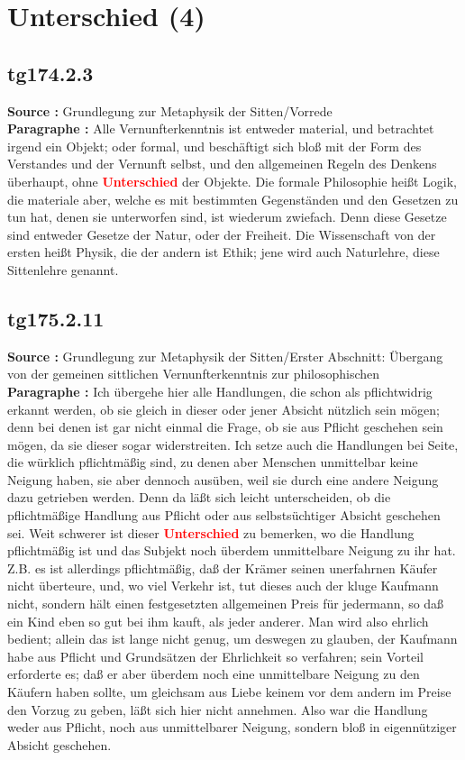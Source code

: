 \documentclass[a4paper,12pt,twoside]{book}
\newcommand{\match}[1]{\textcolor{red}{\textbf{#1}}}
\newcommand{\unnumberedsection}[1]{
	\section*{#1}
	\addcontentsline{toc}{section}{#1}
	\markright{#1}
}
\begin{document}
	\unnumberedsection{Unterschied (4)} 
	\subsection*{tg174.2.3} 
	\textbf{Source : }Grundlegung zur Metaphysik der Sitten/Vorrede\\  
	
	\noindent\textbf{Paragraphe : }Alle Vernunfterkenntnis ist entweder material, und betrachtet irgend ein Objekt; oder formal, und beschäftigt sich bloß mit der Form des Verstandes und der Vernunft selbst, und den allgemeinen Regeln des Denkens überhaupt, ohne \match{Unterschied} der Objekte. Die formale Philosophie heißt Logik, die materiale aber, welche es mit bestimmten Gegenständen und den Gesetzen zu tun hat, denen sie unterworfen sind, ist wiederum zwiefach. Denn diese Gesetze sind entweder Gesetze der Natur, oder der Freiheit. Die Wissenschaft von der ersten heißt Physik, die der andern ist Ethik; jene wird auch Naturlehre, diese Sittenlehre genannt. 
	
	\subsection*{tg175.2.11} 
	\textbf{Source : }Grundlegung zur Metaphysik der Sitten/Erster Abschnitt: Übergang von der gemeinen sittlichen Vernunfterkenntnis zur philosophischen\\  
	
	\noindent\textbf{Paragraphe : }Ich übergehe hier alle Handlungen, die schon als pflichtwidrig erkannt werden, ob sie gleich in dieser oder jener Absicht nützlich sein mögen; denn bei denen ist gar nicht einmal die Frage, ob sie aus Pflicht geschehen sein mögen,  da sie dieser sogar widerstreiten. Ich setze auch die Handlungen bei Seite, die würklich pflichtmäßig sind, zu denen aber Menschen unmittelbar keine Neigung haben, sie aber dennoch ausüben, weil sie durch eine andere Neigung dazu getrieben werden. Denn da läßt sich leicht unterscheiden, ob die pflichtmäßige Handlung aus Pflicht oder aus selbstsüchtiger Absicht geschehen sei. Weit schwerer ist dieser \match{Unterschied} zu bemerken, wo die Handlung pflichtmäßig ist und das Subjekt noch überdem unmittelbare Neigung zu ihr hat. Z.B. es ist allerdings pflichtmäßig, daß der Krämer seinen unerfahrnen Käufer nicht überteure, und, wo viel Verkehr ist, tut dieses auch der kluge Kaufmann nicht, sondern hält einen festgesetzten allgemeinen Preis für jedermann, so daß ein Kind eben so gut bei ihm kauft, als jeder anderer. Man wird also ehrlich bedient; allein das ist lange nicht genug, um deswegen zu glauben, der Kaufmann habe aus Pflicht und Grundsätzen der Ehrlichkeit so verfahren; sein Vorteil erforderte es; daß er aber überdem noch eine unmittelbare Neigung zu den Käufern haben sollte, um gleichsam aus Liebe keinem vor dem andern im Preise den Vorzug zu geben, läßt sich hier nicht annehmen. Also war die Handlung weder aus Pflicht, noch aus unmittelbarer Neigung, sondern bloß in eigennütziger Absicht geschehen. 
	
\end{document}
